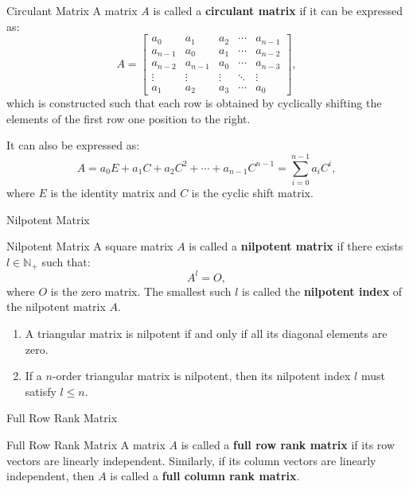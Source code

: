\documentclass[11pt]{../../TexTemplate/elegantbook} %
\begin{document}
\begin{definition}{Circulant Matrix}
    A matrix \(A\) is called a \textbf{circulant matrix} if it can be expressed as:
    \[
    A = 
    \begin{bmatrix} 
        a_0 & a_1 & a_2 & \cdots & a_{n-1} \\ 
        a_{n-1} & a_0 & a_1 & \cdots & a_{n-2} \\ 
        a_{n-2} & a_{n-1} & a_0 & \cdots & a_{n-3} \\ 
        \vdots & \vdots & \vdots & \ddots & \vdots \\ 
        a_1 & a_2 & a_3 & \cdots & a_0
    \end{bmatrix},
    \]
    which is constructed such that each row is obtained by cyclically shifting 
    the elements of the first row one position to the right.

    It can also be expressed as:
    \[
    A = a_0 E + a_1 C + a_2 C^2 + \cdots + a_{n-1} C^{n-1} = \sum_{i=0}^{n-1} a_i C^i,
    \]
    where \(E\) is the identity matrix and \(C\) is the cyclic shift matrix.
\end{definition}


\begin{leftbarTitle}{Nilpotent Matrix}\end{leftbarTitle}
\begin{definition}{Nilpotent Matrix}
    A square matrix \(A\) is called a \textbf{nilpotent matrix} if there exists \(l\in \mathbb{N}_{+}\) such that:
    \[
    A^l = O,
    \]
    where \(O\) is the zero matrix.
    The smallest such \(l\) is called the \textbf{nilpotent index} of the nilpotent matrix \(A\).
\end{definition}

\begin{proposition}
    \begin{enumerate}
        \item A triangular matrix is nilpotent if and only if all its diagonal elements are zero. 
        \item If a \(n\)-order triangular matrix is nilpotent, then its nilpotent index \(l\) must satisfy \(l \leq n\).
    \end{enumerate}
\end{proposition}


\begin{leftbarTitle}{Full Row Rank Matrix}\end{leftbarTitle}
\begin{definition}{Full Row Rank Matrix}
    A matrix \(A\) is called a \textbf{full row rank matrix} if its row vectors are linearly independent.
    Similarly, if its column vectors are linearly independent, 
    then \(A\) is called a \textbf{full column rank matrix}.
\end{definition}
\end{document}

